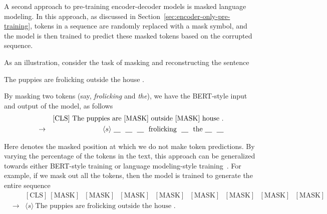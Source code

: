 A second approach to pre-training encoder-decoder models is masked language modeling. In this approach, as discussed in Section~\ref{sec:encoder-only-pre-training}, tokens in a sequence are randomly replaced with a mask symbol, and the model is then trained to predict these masked tokens based on the corrupted sequence.

As an illustration, consider the task of masking and reconstructing the sentence

\vspace{0.5em}
\begin{center}
The puppies are frolicking outside the house .
\end{center}
\vspace{0.5em}

\noindent By masking two tokens (say, \textit{frolicking} and \textit{the}), we have the BERT-style input and output of the model, as follows
\begin{eqnarray}
&     & \mathrm{[CLS]}\ \textrm{The puppies are $\mathrm{[MASK]}$ outside $\mathrm{[MASK]}$ house .} \nonumber \\
& \to & \langle s \rangle\ \textrm{\underline{\hspace{1em}}\ \ \underline{\hspace{1em}}\ \ \underline{\hspace{1em}}\ \ frolicking\ \ \underline{\hspace{1em}}\ \ the \underline{\hspace{1em}}\ \ \underline{\hspace{1em}}} \nonumber
\end{eqnarray}

\noindent Here \underline{\hspace{1em}} denotes the masked position at which we do not make token predictions. By varying the percentage of the tokens in the text, this approach can be generalized towards either BERT-style training or language modeling-style training~\cite{song-etal:2019mass}. For example, if we mask out all the tokens, then the model is trained to generate the entire sequence
\begin{eqnarray}
&     & \mathrm{[CLS]}\ \textrm{$\mathrm{[MASK]}$ $\mathrm{[MASK]}$ $\mathrm{[MASK]}$ $\mathrm{[MASK]}$ $\mathrm{[MASK]}$ $\mathrm{[MASK]}$ $\mathrm{[MASK]}$ $\mathrm{[MASK]}$} \nonumber \\
& \to & \langle s \rangle\ \textrm{The puppies are frolicking outside the house .} \nonumber
\end{eqnarray}

